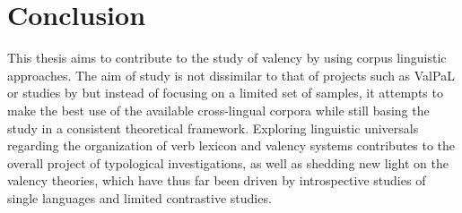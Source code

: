 \section{Conclusion}\label{sec:conclusion}

This thesis aims to contribute to the study of valency by using corpus linguistic approaches. The aim of study is not dissimilar to that of projects such as ValPaL or studies by \citet{say2014} but instead of focusing on a limited set of samples, it attempts to make the best use of the available cross-lingual corpora while still basing the study in a consistent theoretical framework. Exploring linguistic universals regarding the organization of verb lexicon and valency systems contributes to the overall project of typological investigations, as well as shedding new light on the valency theories, which have thus far been driven by introspective studies of single languages and limited contrastive studies.